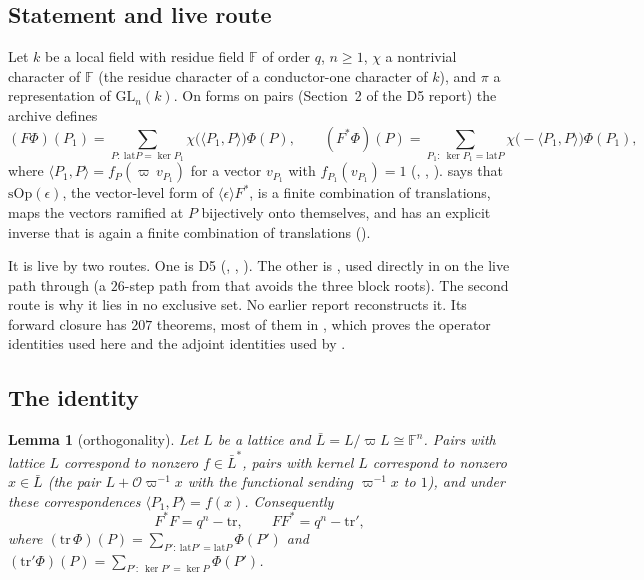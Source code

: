 \documentclass[11pt]{article}
\newcommand{\Ok}{\mathcal O}
\newcommand{\GL}{\mathrm{GL}}
\newcommand{\Fq}{\mathbb F}
\newtheorem{lemma}[theorem]{Lemma}
\theoremstyle{definition}
\theoremstyle{remark}
\begin{document}
\subsection{Statement and live route}
Let $k$ be a local field with residue field $\Fq$ of order $q$, $n\ge1$, $\chi$ a nontrivial character of $\Fq$ (the residue character of a conductor-one character of $k$), and $\pi$ a representation of $\GL_n(k)$. On forms on pairs (Section~2 of the D5 report) the archive defines
\[
(F\Phi)(P_1)=\sum_{P:\ \mathrm{lat}P=\ker P_1}\chi\big(\langle P_1,P\rangle\big)\Phi(P),\qquad
(F^{*}\Phi)(P)=\sum_{P_1:\ \ker P_1=\mathrm{lat}P}\chi\big(-\langle P_1,P\rangle\big)\Phi(P_1),
\]
where $\langle P_1,P\rangle=f_P(\varpi\,v_{P_1})$ for a vector $v_{P_1}$ with $f_{P_1}(v_{P_1})=1$ (, , ).  says that $\mathrm{sOp}(\epsilon)$, the vector-level form of $\langle\epsilon\rangle F^{*}$, is a finite combination of translations, maps the vectors ramified at $P$ bijectively onto themselves, and has an explicit inverse that is again a finite combination of translations ().

It is live by two routes. One is D5 (, , ). The other is , used directly in  on the live path through  (a $26$-step path from  that avoids the three block roots). The second route is why it lies in no exclusive set. No earlier report reconstructs it. Its forward closure has $207$ theorems, most of them in , which proves the operator identities used here and the adjoint identities used by .

\subsection{The identity}

\begin{lemma}[orthogonality]\label{lem:orth}
Let $L$ be a lattice and $\bar L=L/\varpi L\cong\Fq^{n}$. Pairs with lattice $L$ correspond to nonzero $f\in\bar L^{*}$, pairs with kernel $L$ correspond to nonzero $x\in\bar L$ (the pair $L+\Ok\varpi^{-1}x$ with the functional sending $\varpi^{-1}x$ to $1$), and under these correspondences $\langle P_1,P\rangle=f(x)$. Consequently
\[
F^{*}F=q^{n}-\mathrm{tr},\qquad FF^{*}=q^{n}-\mathrm{tr}',
\]
where $(\mathrm{tr}\,\Phi)(P)=\sum_{P':\ \mathrm{lat}P'=\mathrm{lat}P}\Phi(P')$ and $(\mathrm{tr}'\Phi)(P)=\sum_{P':\ \ker P'=\ker P}\Phi(P')$.
\end{lemma}
\end{document}
